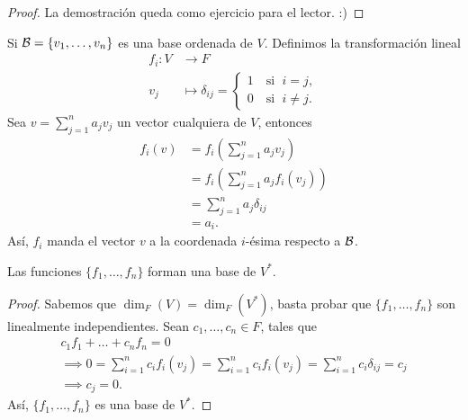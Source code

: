 \documentclass[12pt,a4paper]{book}
\newcommand{\llaves}[1]{\{#1\}}
\newcommand{\parentesis}[1]{\left(#1\right)}
\begin{document}
    \begin{proof}
        La demostración queda como ejercicio para el lector. :)
    \end{proof}


    Si $\BB = \llaves{v_{1}, \dots, v_{n}}$ es una base ordenada de $V$. Definimos la transformación lineal
    \begin{align*}
        f_{i}: V & \longrightarrow F\\
        v_{j} & \longmapsto \delta_{ij} = 
        \begin{cases}
            1 \quad \text{si } \; i = j,\\
            0 \quad \text{si } \; i \neq j.
        \end{cases}
    \end{align*}
    Sea $v = \sum_{j = 1}^{n} a_{j}v_{j}$ un vector cualquiera de $V$, entonces
    \begin{align*}
        f_{i}(v) & = f_{i}\parentesis{\sum_{j = 1}^{n}a_{j}v_{j}}\\
        & = f_{i}\parentesis{\sum_{j = 1}^{n}a_{j}f_{i}(v_{j})}\\
        & = \sum_{j = 1}^{n}a_{j}\delta_{ij}\\
        & = a_{i}.
    \end{align*}
    Así, $f_{i}$ manda el vector $v$ a la coordenada $i$-ésima respecto a $\mathcal{B}$.

    \begin{proposicion}
    \label{prop:36}
        Las funciones $\llaves{f_{1}, \dots, f_{n}}$ forman una base de $V^{*}$.
    \end{proposicion}
    
    \begin{proof}
        Sabemos que $\dim_{F}(V) = \dim_{F}(V^{*})$, basta probar que $\llaves{f_{1}, \dots, f_{n}}$ son linealmente independientes. Sean $c_{1}, \dots, c_{n} \in F$, tales que
        \begin{gather*}
            c_{1}f_{1} + \dots + c_{n}f_{n} = 0\\
            \implies0= \sum_{i = 1}^{n}c_{i}f_{i}(v_{j}) = \sum_{i = 1}^{n}c_{i}f_{i}(v_{j}) = \sum_{i = 1}^{n}c_{i} \delta_{ij} = c_{j}\\
            \implies c_{j} = 0.
        \end{gather*}
        Así, $\llaves{f_{1}, \dots, f_{n}}$ es una base de $V^{*}$.
    \end{proof}
\end{document}
